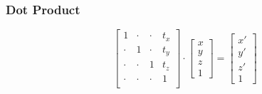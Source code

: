 \documentclass[10pt]{beamer}
\begin{document}
\begin{frame}[fragile]
  \frametitle{Dot Product}
  \[ \begin{bmatrix}
      1     & \cdot & \cdot & t_{x} \\
      \cdot & 1     & \cdot & t_{y} \\
      \cdot & \cdot & 1     & t_{z} \\
      \cdot & \cdot & \cdot & 1     \\
    \end{bmatrix}
    \cdot
    \begin{bmatrix}
      x \\ y \\ z \\ 1
    \end{bmatrix}
    =
    \begin{bmatrix}
      x' \\ y' \\ z' \\ 1
    \end{bmatrix}
  \]
\end{frame}
\end{document}

